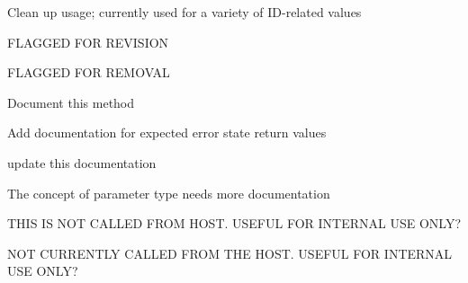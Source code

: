 \begin{DoxyRefList}
%
Clean up usage; currently used for a variety of ID-\/related values  
\item[Member \mbox{\hyperlink{a00524_aa5ffa1ed828630b6b7a13c049d93ae87}{AAX\+\_\+\+EParameter\+Orientation\+Bits}} ]\label{a00878__todo000028}%
%
FLAGGED FOR REVISION 
\item[Member \mbox{\hyperlink{a00524_ace1a00189fa05277582cfb1e8ad48014}{AAX\+\_\+\+EParameter\+Type}} ]\label{a00878__todo000027}%
%
FLAGGED FOR REMOVAL 
\item[Member \mbox{\hyperlink{a02064_a3922a4b9fef09e88440d7655422c2b96}{AAX\+\_\+\+IACFEffect\+GUI\+::Set\+Control\+Highlight\+Info}} (AAX\+\_\+\+CParam\+ID i\+Parameter\+ID, AAX\+\_\+\+CBoolean i\+Is\+Highlighted, AAX\+\_\+\+EHighlight\+Color i\+Color)=0]\label{a00878__todo000029}%
%
Document this method 
\item[Class \mbox{\hyperlink{a02068}{AAX\+\_\+\+IACFEffect\+Parameters}} ]\label{a00878__todo000030}%
%
Add documentation for expected error state return values 
\item[Member \mbox{\hyperlink{a02068_ac122e1a693296b059dca4350a5ff1dfe}{AAX\+\_\+\+IACFEffect\+Parameters\+::Get\+Parameter\+Orientation}} (AAX\+\_\+\+CParam\+ID i\+Parameter\+ID, AAX\+\_\+\+EParameter\+Orientation $\ast$o\+Parameter\+Orientation) const =0]\label{a00878__todo000037}%
%
update this documentation 
\item[Member \mbox{\hyperlink{a02068_ae7f6d803fa9a472a4bad583868e3b951}{AAX\+\_\+\+IACFEffect\+Parameters\+::Get\+Parameter\+Type}} (AAX\+\_\+\+CParam\+ID i\+Parameter\+ID, AAX\+\_\+\+EParameter\+Type $\ast$o\+Parameter\+Type) const =0]\label{a00878__todo000036}%
%
The concept of parameter type needs more documentation 
\item[Member \mbox{\hyperlink{a02068_a333b83bc6f37b0103ce0de65be02fede}{AAX\+\_\+\+IACFEffect\+Parameters\+::Set\+Parameter\+Default\+Normalized\+Value}} (AAX\+\_\+\+CParam\+ID i\+Parameter\+ID, double i\+Value)=0]\label{a00878__todo000035}%
%
THIS IS NOT CALLED FROM HOST. USEFUL FOR INTERNAL USE ONLY? 
\item[Member \mbox{\hyperlink{a02068_a6e28a427a0d7d0c8df69dd5eb88cff6c}{AAX\+\_\+\+IACFEffect\+Parameters\+::Set\+Parameter\+Normalized\+Relative}} (AAX\+\_\+\+CParam\+ID i\+Parameter\+ID, double i\+Value)=0]\label{a00878__todo000039}%
%
NOT CURRENTLY CALLED FROM THE HOST. USEFUL FOR INTERNAL USE ONLY?


\end{DoxyRefList}
